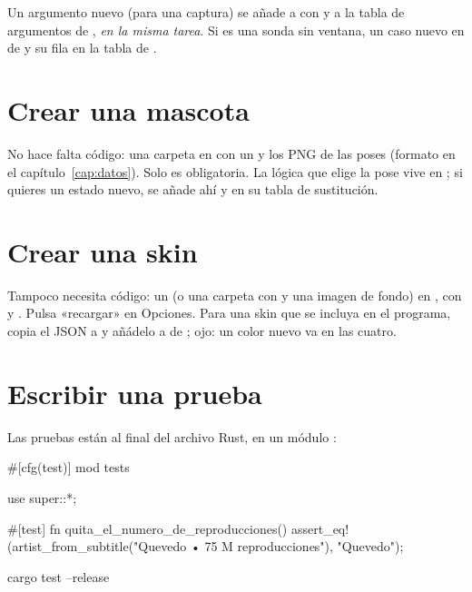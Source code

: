 Un argumento nuevo (para una captura) se añade a  con 
y a la tabla de argumentos de , \emph{en la misma
tarea}. Si es una sonda sin ventana, un caso nuevo en  de  y su
fila en la tabla de .

\section{Crear una mascota}

No hace falta código: una carpeta en  con un
 y los PNG de las poses (formato en el capítulo~\ref{cap:datos}). Solo
 es obligatoria. La lógica que elige la pose vive en ; si
quieres un estado nuevo, se añade ahí y en su tabla de sustitución.

\section{Crear una skin}

Tampoco necesita código: un  (o una carpeta con  y una imagen de
fondo) en , con  y . Pulsa
«recargar» en Opciones. Para una skin que se incluya en el programa, copia el JSON a
 y añádelo a  de ; ojo: un color nuevo
va en las cuatro.

\section{Escribir una prueba}

Las pruebas están al final del archivo Rust, en un módulo :

\begin{rust}
#[cfg(test)]
mod tests {
    use super::*;

    #[test]
    fn quita_el_numero_de_reproducciones() {
        assert_eq!(artist_from_subtitle("Quevedo • 75 M reproducciones"), "Quevedo");
    }
}
\end{rust}

\begin{terminal}
cargo test --release
\end{terminal}


